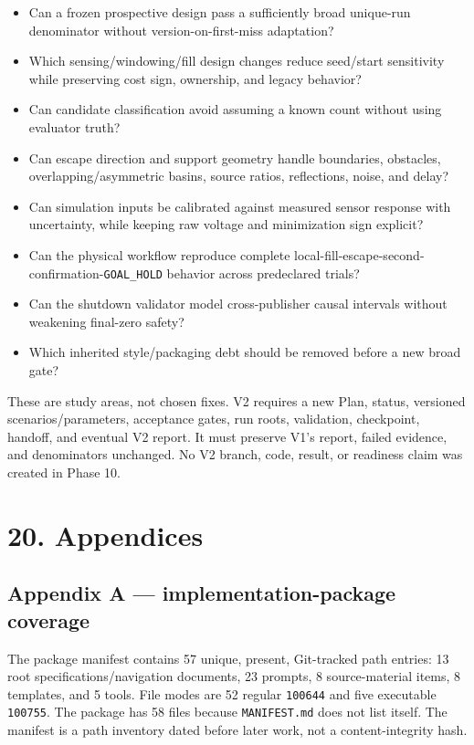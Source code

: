 \documentclass[
  10pt,
  letterpaper,
]{article}
\providecommand{\tightlist}{%
  \setlength{\itemsep}{0pt}\setlength{\parskip}{0pt}}
\begin{document}
\begin{itemize}
\tightlist
\item
  Can a frozen prospective design pass a sufficiently broad unique-run
  denominator without version-on-first-miss adaptation?
\item
  Which sensing/windowing/fill design changes reduce seed/start sensitivity
  while preserving cost sign, ownership, and legacy behavior?
\item
  Can candidate classification avoid assuming a known count without using
  evaluator truth?
\item
  Can escape direction and support geometry handle boundaries, obstacles,
  overlapping/asymmetric basins, source ratios, reflections, noise, and delay?
\item
  Can simulation inputs be calibrated against measured sensor response with
  uncertainty, while keeping raw voltage and minimization sign explicit?
\item
  Can the physical workflow reproduce complete local-fill-escape-second-
  confirmation-\nolinkurl{GOAL\_HOLD} behavior across predeclared trials?
\item
  Can the shutdown validator model cross-publisher causal intervals without
  weakening final-zero safety?
\item
  Which inherited style/packaging debt should be removed before a new broad
  gate?
\end{itemize}

These are study areas, not chosen fixes. V2 requires a new Plan, status,
versioned scenarios/parameters, acceptance gates, run roots, validation,
checkpoint, handoff, and eventual V2 report. It must preserve V1's report,
failed evidence, and denominators unchanged. No V2 branch, code, result, or
readiness claim was created in Phase 10.

\section{20. Appendices}\label{appendices}

\subsection{Appendix A --- implementation-package coverage}\label{appendix-a-implementation-package-coverage}

The package manifest contains 57 unique, present, Git-tracked path entries:
13 root specifications/navigation documents, 23 prompts, 8 source-material
items, 8 templates, and 5 tools. File modes are 52 regular \nolinkurl{100644} and five
executable \nolinkurl{100755}. The package has 58 files because \nolinkurl{MANIFEST.md} does not
list itself. The manifest is a path inventory dated before later work, not a
content-integrity hash.
\end{document}
